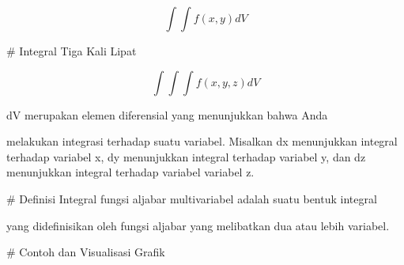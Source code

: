 \documentclass[a4paper,10pt]{article}
\begin{document}
\begin{eulernotebook}
\begin{eulercomment}
\begin{eulercomment}
\begin{eulercomment}
\begin{eulercomment}
\begin{eulercomment}
\begin{eulercomment}
\begin{eulercomment}
\begin{eulercomment}
\begin{eulercomment}
\begin{eulercomment}
\begin{eulercomment}
\end{eulercomment}
\begin{eulerformula}
\[
\int \int f(x,y) dV
\]
\end{eulerformula}
\begin{eulercomment}
\end{eulercomment}
\begin{eulerttcomment}
    # Integral Tiga Kali Lipat
\end{eulerttcomment}
\begin{eulerformula}
\[
\int \int \int f(x,y,z) dV
\]
\end{eulerformula}
\begin{eulercomment}
\end{eulercomment}
\begin{eulerttcomment}
  dV merupakan elemen diferensial yang menunjukkan bahwa Anda
\end{eulerttcomment}
\begin{eulercomment}
melakukan integrasi terhadap suatu variabel. Misalkan dx menunjukkan
integral terhadap variabel x, dy menunjukkan integral terhadap
variabel y, dan dz menunjukkan integral terhadap variabel variabel z.

\begin{eulercomment}
\begin{eulercomment}
\end{eulercomment}
\begin{eulerttcomment}
 # Definisi
   Integral fungsi aljabar multivariabel adalah suatu bentuk integral
\end{eulerttcomment}
\begin{eulercomment}
yang didefinisikan oleh fungsi aljabar yang melibatkan dua atau lebih
variabel.

\end{eulercomment}
\begin{eulerttcomment}
 # Contoh dan Visualisasi Grafik
\end{eulerttcomment}
\begin{eulercomment}


\end{eulercomment}
\end{eulercomment}
\end{eulercomment}
\end{eulercomment}
\end{eulercomment}
\end{eulercomment}
\end{eulercomment}
\end{eulercomment}
\end{eulercomment}
\end{eulercomment}
\end{eulercomment}
\end{eulercomment}
\end{eulercomment}
\end{eulernotebook}
\end{document}
